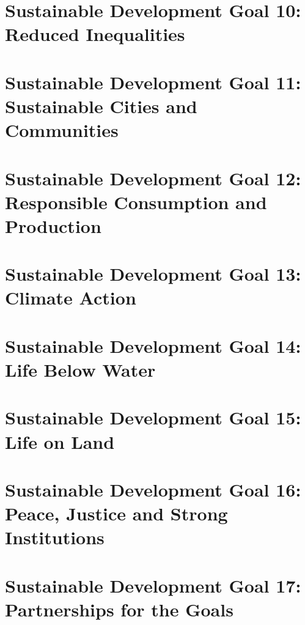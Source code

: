 \documentclass[11pt]{book}
\begin{document}
\chapter{Sustainable Development Goal 10: Reduced Inequalities}

\chapter{Sustainable Development Goal 11: Sustainable Cities and Communities}

\chapter{Sustainable Development Goal 12: Responsible Consumption and Production}

\chapter{Sustainable Development Goal 13: Climate Action}

\chapter{Sustainable Development Goal 14: Life Below Water}

\chapter{Sustainable Development Goal 15: Life on Land}

\chapter{Sustainable Development Goal 16: Peace, Justice and Strong Institutions}

\chapter{Sustainable Development Goal 17: Partnerships for the Goals}
\end{document}
